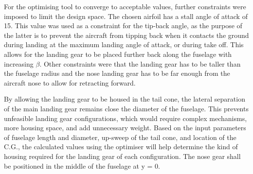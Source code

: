 For the optimising tool to converge to acceptable values, further constraints were imposed to limit the design space. The chosen airfoil has a stall angle of attack of 15\degree {}. This value was used as a constraint for the tip-back angle, as the purpose of the latter is to prevent the aircraft from tipping back when it contacts the ground during landing at the maximum landing angle of attack, or during take off. 
This allows for the landing gear to be placed further back along the fuselage with increasing $\beta$. Other constraints were that the landing gear has to be taller than the fuselage radius and the nose landing gear has to be far enough from the aircraft nose to allow for retracting forward.

By allowing the landing gear to be housed in the tail cone, the lateral separation of the main landing gear remains close the diameter of the fuselage. This prevents unfeasible landing gear configurations, which would require complex mechanisms, more housing space, and add unnecessary weight. Based on the input parameters of fuselage length and diameter, up-sweep of the tail cone, and location of the C.G., the calculated values using the optimiser will help determine the kind of housing required for the landing gear of each configuration. The nose gear shall be positioned in the middle of the fuselage at y = 0.

